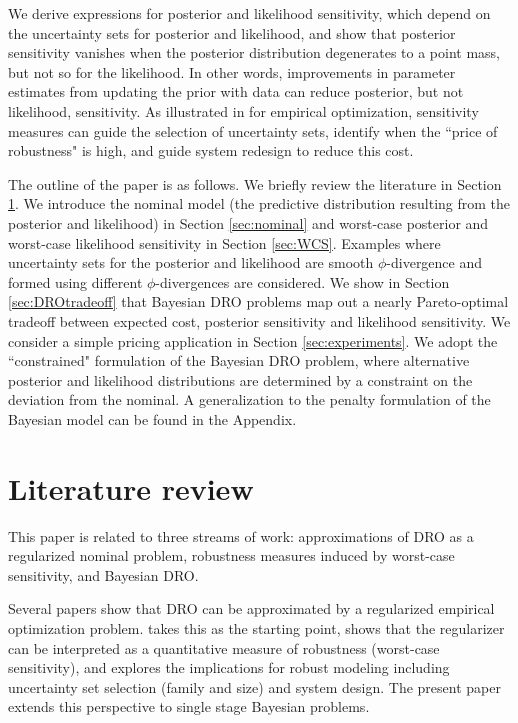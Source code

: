 \documentclass[11pt,reqno,letter]{amsart}
\theoremstyle{plain}
\theoremstyle{definition}
\numberwithin{equation}{section}
\numberwithin{theorem}{section}
\numberwithin{table}{section}
\numberwithin{figure}{section}
\begin{document}
We derive expressions for posterior and likelihood sensitivity, which depend on the uncertainty sets for posterior and likelihood, and show that posterior sensitivity vanishes when the posterior distribution degenerates to a point mass, but not so for the likelihood. In other words, improvements in parameter estimates from updating the prior with data can reduce posterior, but not likelihood, sensitivity. As illustrated in \cite{gotoh2026sensitivity} for empirical optimization, sensitivity measures can guide the selection of uncertainty sets, identify when the ``price of robustness" is high, and guide system redesign to reduce this cost. 

The outline of the paper is as follows. We briefly review the literature in Section \ref{sec:lit}. We introduce the nominal model (the predictive distribution resulting from the posterior and likelihood) in Section \ref{sec:nominal} and worst-case posterior and worst-case likelihood sensitivity in Section \ref{sec:WCS}. Examples where uncertainty sets for the posterior and likelihood are smooth $\phi$-divergence and formed using different $\phi$-divergences are considered. We show in Section \ref{sec:DROtradeoff} that Bayesian DRO problems map out a nearly Pareto-optimal tradeoff between expected cost, posterior sensitivity and likelihood sensitivity. We consider a simple pricing application in Section \ref{sec:experiments}. We adopt the ``constrained" formulation of the Bayesian DRO problem, where alternative posterior and likelihood distributions are determined by a constraint on the deviation from the nominal. A generalization to the penalty formulation of the Bayesian model can be found in the Appendix.

\section{Literature review}
\label{sec:lit}

This paper is related to three streams of work: approximations of DRO as a regularized nominal problem, robustness measures induced by worst-case sensitivity, and Bayesian DRO.

Several papers \cite{bertsimas2018,blanchet2019,Duchi2017variance,esfahani2018data,gao2023distributionally, gao2024wasserstein,kuhn2019wasserstein} show that DRO can be approximated by a regularized empirical optimization problem. \cite{gotoh2026sensitivity} takes this as the starting point, shows that the regularizer can be interpreted as a quantitative measure of robustness (worst-case sensitivity), and explores the implications for robust modeling including uncertainty set selection (family and size) and system design. The present paper extends this perspective to single stage Bayesian problems. 
\end{document}
